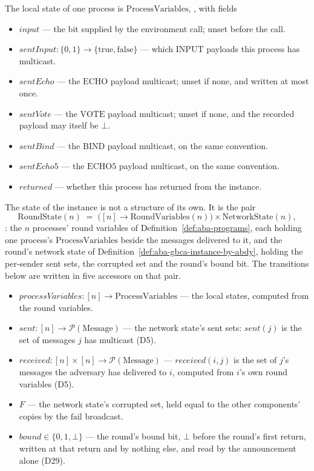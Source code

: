 The local state of one process is $\mathrm{ProcessVariables}$, , with fields
\begin{itemize}
  \item $\mathit{input}$ --- the bit supplied by the environment call; unset
    before the call.
  \item $\mathit{sentInput} : \{0,1\} \to \{\text{true},\text{false}\}$ --- which
    $\mathrm{INPUT}$ payloads this process has multicast.
  \item $\mathit{sentEcho}$ --- the $\mathrm{ECHO}$ payload multicast; unset if
    none, and written at most once.
  \item $\mathit{sentVote}$ --- the $\mathrm{VOTE}$ payload multicast; unset if
    none, and the recorded payload may itself be $\bot$.
  \item $\mathit{sentBind}$ --- the $\mathrm{BIND}$ payload multicast, on the
    same convention.
  \item $\mathit{sentEcho5}$ --- the $\mathrm{ECHO5}$ payload multicast, on the
    same convention.
  \item $\mathit{returned}$ --- whether this process has returned from the
    instance.
\end{itemize}
The state of the instance is not a structure of its own.
It is the pair
\[
  \mathrm{RoundState}(n) \;=\;
    \bigl([n] \to \mathrm{RoundVariables}(n)\bigr) \times \mathrm{NetworkState}(n),
\]
: the $n$ processes' round variables of
Definition~\ref{def:aba-programs}, each holding one process's $\mathrm{ProcessVariables}$ beside the messages delivered to it, and the round's network state of Definition~\ref{def:aba-gbca-instance-by-abdy}, holding the per-sender sent sets, the corrupted set and the round's bound bit.
The transitions below are written in five accessors on that pair.
\begin{itemize}
  \item $\mathit{processVariables} : [n] \to \mathrm{ProcessVariables}$ --- the local states, computed
    from the round variables.
  \item $\mathit{sent} : [n] \to \mathcal{P}(\mathrm{Message})$ --- the network state's
    sent sets: $\mathit{sent}(j)$ is the set of messages $j$ has multicast (D5).
  \item $\mathit{received} : [n] \times [n] \to \mathcal{P}(\mathrm{Message})$ ---
    $\mathit{received}(i,j)$ is the set of $j$'s messages the adversary has delivered to $i$, computed from $i$'s own round variables (D5).
  \item $F$ --- the network state's corrupted set, held equal to the other
    components' copies by the $\mathrm{fail}$ broadcast.
  \item $\mathit{bound} \in \{0,1,\bot\}$ --- the round's bound bit, $\bot$ before
    the round's first return, written at that return and by nothing else, and read
    by the announcement alone (D29).
\end{itemize}
